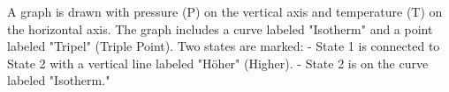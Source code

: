 A graph is drawn with pressure (P) on the vertical axis and temperature (T) on the horizontal axis. The graph includes a curve labeled "Isotherm" and a point labeled "Tripel" (Triple Point). Two states are marked:  
- State 1 is connected to State 2 with a vertical line labeled "Höher" (Higher).  
- State 2 is on the curve labeled "Isotherm."